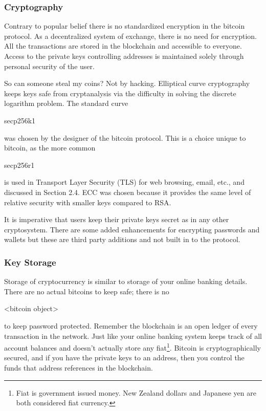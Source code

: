 \subsubsection*{Cryptography}\label{Se:bitcoinCryptography}
Contrary to popular belief there is no standardized encryption in the bitcoin protocol. As a decentralized system of exchange, there is no need for encryption. All the transactions are stored in the blockchain and accessible to everyone. Access to the private keys controlling addresses is maintained solely through personal security of the user. 

So can someone steal my coins? Not by hacking. Elliptical curve cryptography keeps keys safe from cryptanalysis via the difficulty in solving the discrete logarithm problem. The standard curve \begin{code}secp256k1\end{code} was chosen by the designer of the bitcoin protocol. This is a choice unique to bitcoin, as the more common \begin{code}secp256r1\end{code} is used in Transport Layer Security (TLS) for web browsing, email, etc., and discussed in Section 2.4. ECC was chosen because it provides the same level of relative security with smaller keys compared to RSA.

It is imperative that users keep their private keys secret as in any other cryptosystem. There are some added enhancements for encrypting passwords and wallets but these are third party additions and not built in to the protocol.

\subsubsection*{Key Storage}
Storage of cryptocurrency is similar to storage of your online banking details. There are no actual bitcoins to keep safe; there is no \begin{code}<bitcoin object>\end{code} to keep password protected. Remember the blockchain is an open ledger of every transaction in the network. Just like your online banking system keeps track of all account balances and doesn't actually store any fiat\footnote{Fiat is government issued money. New Zealand dollars and Japanese yen are both considered fiat currency.}. Bitcoin is cryptographically secured, and if you have the private keys to an address, then you control the funds that address references in the blockchain. 

